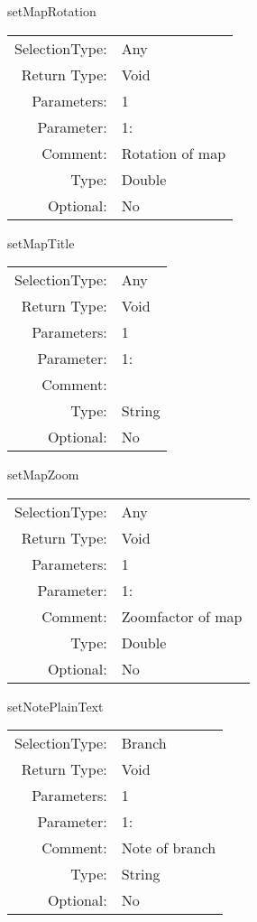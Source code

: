 \item setMapRotation\\
\begin{tabular}{rl}
  SelectionType: & Any\\
    Return Type: & Void\\
     Parameters: & 1\\
   Parameter: &  1:\\
        Comment: & Rotation of map\\
           Type: & Double\\
       Optional: &  No\\
\end{tabular}

\item setMapTitle\\
\begin{tabular}{rl}
  SelectionType: & Any\\
    Return Type: & Void\\
     Parameters: & 1\\
   Parameter: &  1:\\
        Comment: & \\
           Type: & String\\
       Optional: &  No\\
\end{tabular}

\item setMapZoom\\
\begin{tabular}{rl}
  SelectionType: & Any\\
    Return Type: & Void\\
     Parameters: & 1\\
   Parameter: &  1:\\
        Comment: & Zoomfactor of map\\
           Type: & Double\\
       Optional: &  No\\
\end{tabular}

\item setNotePlainText\\
\begin{tabular}{rl}
  SelectionType: & Branch\\
    Return Type: & Void\\
     Parameters: & 1\\
   Parameter: &  1:\\
        Comment: & Note of branch\\
           Type: & String\\
       Optional: &  No\\
\end{tabular}

